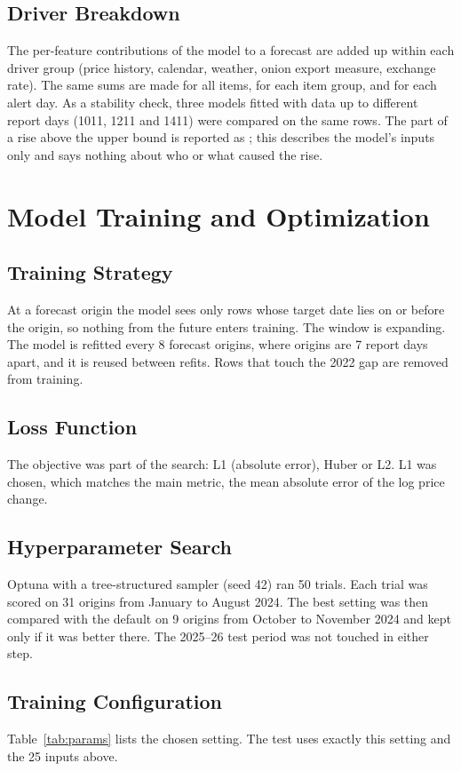 \subsection{Driver Breakdown}
The per-feature contributions of the model to a forecast are added up within each driver group (price history, calendar, weather, onion export measure, exchange rate). The same sums are made for all items, for each item group, and for each alert day. As a stability check, three models fitted with data up to different report days (1011, 1211 and 1411) were compared on the same rows. The part of a rise above the upper bound is reported as \unexpl; this describes the model's inputs only and says nothing about who or what caused the rise.

\section{Model Training and Optimization}

\subsection{Training Strategy}
At a forecast origin the model sees only rows whose target date lies on or before the origin, so nothing from the future enters training. The window is expanding. The model is refitted every 8 forecast origins, where origins are 7 report days apart, and it is reused between refits. Rows that touch the 2022 gap are removed from training.

\subsection{Loss Function}
The objective was part of the search: L1 (absolute error), Huber or L2. L1 was chosen, which matches the main metric, the mean absolute error of the log price change.

\subsection{Hyperparameter Search}
Optuna \cite{optuna} with a tree-structured sampler (seed 42) ran 50 trials. Each trial was scored on 31 origins from January to August 2024. The best setting was then compared with the default on 9 origins from October to November 2024 and kept only if it was better there. The 2025--26 test period was not touched in either step.

\subsection{Training Configuration}
Table~\ref{tab:params} lists the chosen setting. The test uses exactly this setting and the 25 inputs above.

